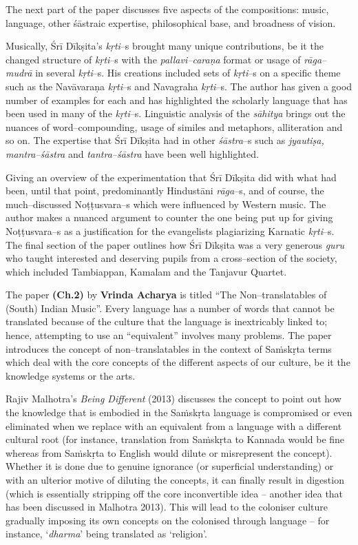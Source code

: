 The next part of the paper discusses five aspects of the compositions: music, language, other śāstraic expertise, philosophical base, and broadness of vision.

Musically, Śrī Dīkṣita’s \textit{kṛti}–s brought many unique contributions, be it the changed structure of \textit{kṛti}–s with the \textit{pallavi–caraṇa} format or usage of \textit{rāga–mudrā} in several \textit{kṛti}–s. His creations included sets of \textit{kṛti}–s on a specific theme such as the Navāvaraṇa \textit{kṛti}–s and Navagraha \textit{kṛti}–s. The author has given a good number of examples for each and has highlighted the scholarly language that has been used in many of the \textit{kṛti}–s. Linguistic analysis of the \textit{sāhitya} brings out the nuances of word–compounding, usage of similes and metaphors, alliteration and so on. The expertise that Śrī Dīkṣita had in other \textit{śāstra}–s such as \textit{jyautiṣa, mantra–śāstra} and \textit{tantra–śāstra} have been well highlighted.

Giving an overview of the experimentation that Śrī Dīkṣita did with what had been, until that point, predominantly Hindustāni \textit{rāga}–s, and of course, the much–discussed Noṭṭusvara–s which were influenced by Western music. The author makes a nuanced argument to counter the one being put up for giving Noṭṭusvara–s as a justification for the evangelists plagiarizing Karnatic \textit{kṛti}–s. The final section of the paper outlines how Śrī Dīkṣita was a very generous \textit{guru} who taught interested and deserving pupils from a cross–section of the society, which included Tambiappan, Kamalam and the Tanjavur Quartet.

The paper \textbf{(Ch.2)} by \textbf{Vrinda Acharya} is titled “The Non–translatables of (South) Indian Music”. Every language has a number of words that cannot be translated because of the culture that the language is inextricably linked to; hence, attempting to use an “equivalent” involves many problems. The paper introduces the concept of non–translatables in the context of Saṁskṛta terms which deal with the core concepts of the different aspects of our culture, be it the knowledge systems or the arts.

Rajiv Malhotra’s \textit{Being Different} (2013) discusses the concept to point out how the knowledge that is embodied in the Saṁskṛta language is compromised or even eliminated when we replace with an equivalent from a language with a different cultural root (for instance, translation from Saṁskṛta to Kannada would be fine whereas from Saṁskṛta to English would dilute or misrepresent the concept). Whether it is done due to genuine ignorance (or superficial understanding) or with an ulterior motive of diluting the concepts, it can finally result in digestion (which is essentially stripping off the core inconvertible idea – another idea that has been discussed in Malhotra 2013). This will lead to the coloniser culture gradually imposing its own concepts on the colonised through language – for instance, ‘\textit{dharma}’ being translated as ‘religion’.

